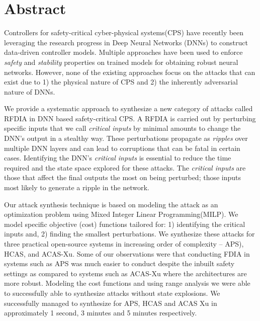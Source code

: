 
\chapter{Abstract}

Controllers for safety-critical cyber-physical systems(CPS) have recently been leveraging the research progress in Deep Neural Networks (DNNs) to construct data-driven controller models. Multiple approaches have been used to enforce \textit{safety} and \textit{stability} properties on trained models for obtaining robust neural networks. However, none of the existing approaches focus on the attacks that can exist due to 1) the physical nature of CPS and 2) the inherently adversarial nature of DNNs.  

We provide a systematic approach to synthesize a new category of attacks called \ac{RFDIA} in DNN based safety-critical CPS. A \ac{RFDIA} is carried out by perturbing specific inputs that we call \textit{critical inputs} by minimal amounts to change the DNN's output in a stealthy way. These perturbations propagate as \textit{ripples} over multiple DNN layers and can lead to corruptions that can be fatal in certain cases. Identifying the DNN's \textit{critical inputs} is essential to reduce the time required and the state space explored for these attacks. The \textit{critical inputs} are those that affect the final outputs the most on being perturbed; those inputs most likely to generate a ripple in the network. 

Our attack synthesis technique is based on modeling the attack as an optimization problem using Mixed Integer Linear Programming(MILP). We model \attack specific objective (cost) functions tailored for: 1) identifying the critical inputs and, 2) finding the smallest perturbations. We synthesize these attacks for three practical open-source systems in increasing order of complexity -- \ac{APS}), \ac{HCAS}, and \ac{ACAS-Xu}. Some of our observations were that conducting \ac{FDIA} in systems such as \ac{APS} was much easier to conduct despite the inbuilt safety settings as compared to systems such as \ac{ACAS-Xu} where the architectures are more robust. Modeling the cost functions and using range analysis we were able to successfully able to synthesize attacks without state explosions. 
We successfully managed to synthesize  \attack for APS, HCAS and ACAS Xu in approximately 1 second, 3 minutes and 5 minutes respectively. 

